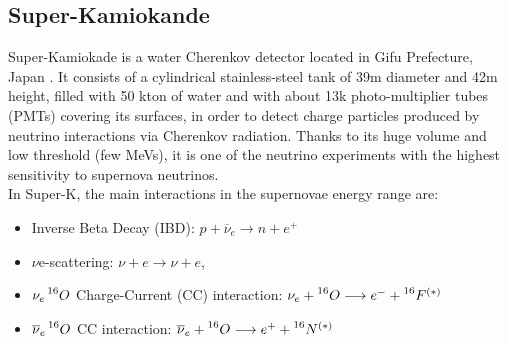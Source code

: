 \documentclass[twocolumn]{aastex631}
\begin{document}
\subsection{Super-Kamiokande}
Super-Kamiokade is a water Cherenkov detector located in Gifu Prefecture, Japan \citep{art:FUKUDA2003}. 
It consists of a cylindrical stainless-steel tank of 39m diameter and 42m height, filled with 50 kton of water and with about 13k photo-multiplier tubes (PMTs) covering its surfaces, in order to detect charge particles produced by neutrino interactions via Cherenkov radiation. Thanks to its huge volume and low threshold (few MeVs), it is one of the neutrino experiments with the highest sensitivity to supernova neutrinos. \\
In Super-K, the main interactions in the supernovae energy range are: 
\begin{itemize}
    \item Inverse Beta Decay (IBD): 
    $p+\overline{\nu}_e\longrightarrow n+e^+$
    \item $\nu$e-scattering: $\nu+e\longrightarrow \nu+e$,
    \item  $\nu_e \prescript{16}{}{O}$ Charge-Current (CC) interaction: 
    $\nu_e + \prescript{16}{}{O}\longrightarrow e^- + \prescript{16}{}{F}^{(*)}$
    \item $\overline{\nu}_e \prescript{16}{}{O}$ CC interaction: 
    $\overline{\nu}_e + \prescript{16}{}{O}\longrightarrow e^+ + \prescript{16}{}{N}^{(*)}$
    
\end{itemize}
\end{document}
